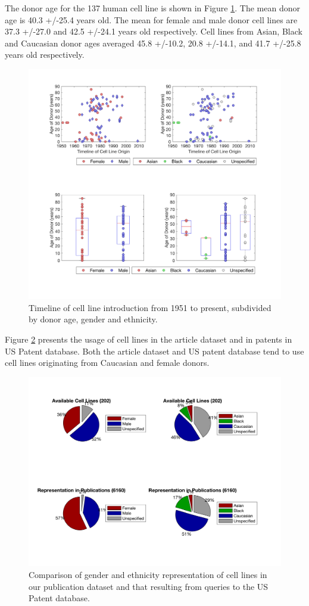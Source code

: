 \documentclass[10pt]{article}
\begin{document}
The donor age for the 137 human cell line is shown in Figure \ref{sc1}. The mean donor age is 40.3 +/-25.4 years old. The mean for female and male donor cell lines are 37.3 +/-27.0 and 42.5 +/-24.1 years old respectively. Cell lines from Asian, Black and Caucasian donor ages averaged 45.8 +/-10.2, 20.8 +/-14.1, and 41.7 +/-25.8 years old respectively. 

\begin{figure}[h!]
\centering
\includegraphics[trim={20cm 20cm 20cm 20cm}, width=0.98\columnwidth]{Figures/ScatterAge_2}
\caption{\label{sc1}Timeline of cell line introduction from 1951 to present, subdivided by donor age, gender and ethnicity.}
\end{figure}

\newpage
Figure \ref {pc1} presents the usage of cell lines in the article dataset and in patents in US Patent database. Both the article dataset and US patent database tend to use cell lines originating from Caucasian and female donors. 

\begin{figure}[h!]
\centering
\includegraphics[width=0.79\columnwidth]{Figures/PieChart1}
\caption{\label{pc1} Comparison of gender and ethnicity representation of cell lines in our publication dataset and that resulting from queries to the US Patent database.}
\end{figure}
\end{document}
